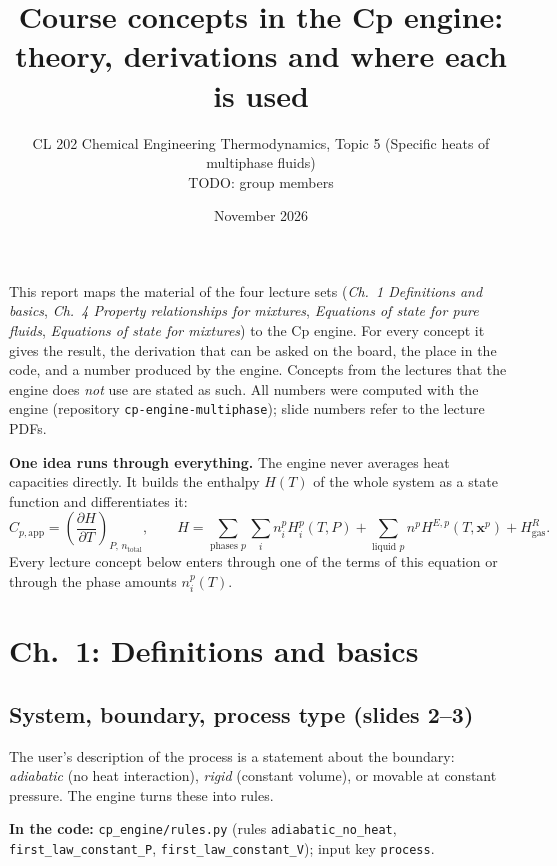 \documentclass[11pt,a4paper]{article}
\title{Course concepts in the Cp engine:\\ theory, derivations and where each is used}
\author{CL 202 Chemical Engineering Thermodynamics, Topic 5 (Specific heats of multiphase fluids)\\
TODO: group members}
\date{November 2026}
\newcommand{\code}[1]{\texttt{\small #1}}
\newcommand{\where}[1]{\par\noindent\textbf{In the code:} #1\par}
\begin{document}
\maketitle

\noindent
This report maps the material of the four lecture sets (\emph{Ch.~1 Definitions and basics},
\emph{Ch.~4 Property relationships for mixtures}, \emph{Equations of state for pure fluids},
\emph{Equations of state for mixtures}) to the Cp engine. For every concept it gives the result, the
derivation that can be asked on the board, the place in the code, and a number produced by the engine.
Concepts from the lectures that the engine does \emph{not} use are stated as such. All numbers were
computed with the engine (repository \code{cp-engine-multiphase}); slide numbers refer to the lecture PDFs.

\tableofcontents
\bigskip

\noindent\textbf{One idea runs through everything.} The engine never averages heat capacities directly.
It builds the enthalpy $H(T)$ of the whole system as a state function and differentiates it:
\begin{equation}
C_{p,\mathrm{app}} = \left(\frac{\partial H}{\partial T}\right)_{P,\,n_{\mathrm{total}}},\qquad
H=\sum_{\text{phases }p}\sum_i n_i^p H_i^p(T,P)+\sum_{\text{liquid }p} n^p H^{E,p}(T,\mathbf{x}^p)+H^R_{\text{gas}}.
\label{eq:main}
\end{equation}
Every lecture concept below enters through one of the terms of this equation or through the phase
amounts $n_i^p(T)$.

\section{Ch.~1: Definitions and basics}

\subsection{System, boundary, process type (slides 2--3)}
The user's description of the process is a statement about the boundary: \emph{adiabatic} (no heat
interaction), \emph{rigid} (constant volume), or movable at constant pressure. The engine turns these into
rules.
\where{\code{cp\_engine/rules.py} (rules \code{adiabatic\_no\_heat}, \code{first\_law\_constant\_P},
\code{first\_law\_constant\_V}); input key \code{process}.}
\end{document}
